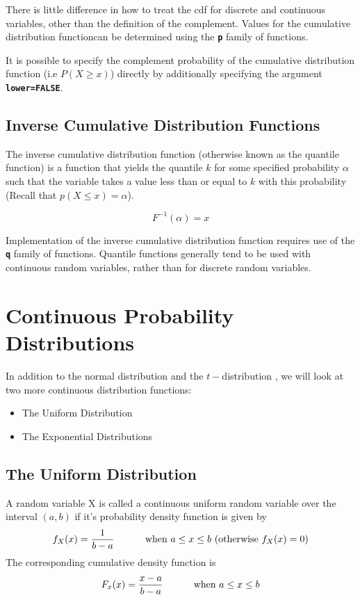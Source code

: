 \documentclass[a4paper,12pt]{article}
\begin{document}
There is little difference in how to treat the cdf for discrete and continuous variables, other than the definition of the complement.
Values for the cumulative distribution functioncan be determined using the \texttt{\textbf{p}} family of functions. 

It is possible to specify the complement probability of the cumulative distribution function (i.e $P(X \geq x)$) directly by additionally specifying the argument \texttt{\textbf{lower=FALSE}}.
 
\subsection{Inverse Cumulative Distribution Functions}

The inverse cumulative distribution function (otherwise known as the quantile function) is a function that yields the quantile $k$ for some specified probability $\alpha$ such that the variable takes a value less than or equal to $k$ with this probability (Recall that $p(X \leq x) = \alpha $).

\[F^{-1}(\alpha) = x  \]

Implementation of the inverse cumulative distribution function requires use of the \texttt{\textbf{q}} family of functions. Quantile functions generally tend to be used with continuous random variables, rather than for discrete random variables.


\section{Continuous Probability Distributions}
In addition to the normal distribution and the $t-$distribution , we will look at two more continuous distribution functions: 
\begin{itemize}
\item The Uniform Distribution
\item The Exponential Distributions
\end{itemize}
\subsection{The Uniform Distribution}

A random variable X is called a continuous uniform random variable over the interval $(a,b)$ if it's probability density function is given by
\[ f_{X}(x) = { 1 \over b-a} \hspace{1cm} \mbox{ when } a \leq x \leq b \mbox{     (otherwise } f_X(x) = 0 ) \]
The corresponding cumulative density function is
\[ F_x(x) = { x-a \over b-a} \hspace{1cm} \mbox{ when } a \leq x \leq b\]
\end{document}
